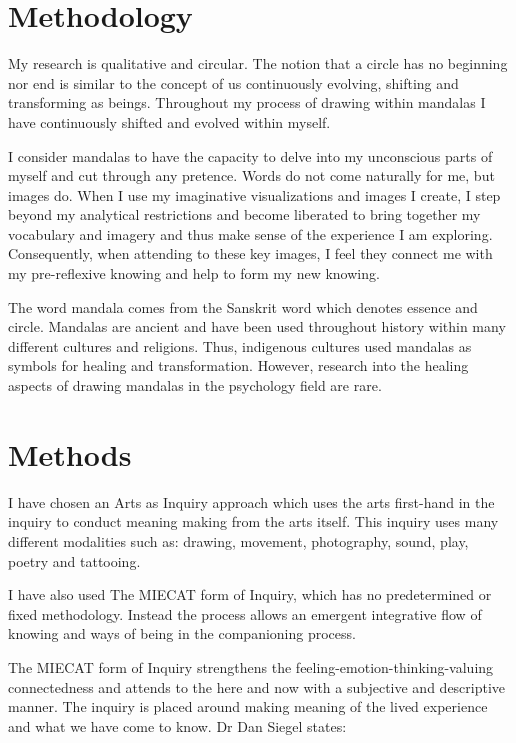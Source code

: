\section{Methodology}

My research is qualitative and circular. The notion that a circle has no beginning nor end is similar to the concept of us continuously evolving, shifting and transforming as beings. Throughout my process of drawing within mandalas I have continuously shifted and evolved within myself. 

I consider mandalas to have the capacity to delve into my unconscious parts of myself and cut through any pretence. Words do not come naturally for me, but images do. When I use my imaginative visualizations and images I create, I step beyond my analytical restrictions and become liberated to bring together my vocabulary and imagery and thus make sense of the experience I am exploring. Consequently, when attending to these key images, I feel they connect me with my pre-reflexive knowing and help to form my new knowing. 

The word mandala comes from the Sanskrit word which denotes essence and circle. Mandalas are ancient and have been used throughout history within many different cultures and religions. Thus, indigenous cultures used mandalas as symbols for healing and transformation. However, research into the healing aspects of drawing mandalas in the psychology field are rare. 

\section{Methods}


I have chosen an Arts as Inquiry approach which uses the arts first-hand in the inquiry to conduct meaning making from the arts itself. This inquiry uses many different modalities such as: drawing, movement, photography, sound, play, poetry and tattooing.

I have also used The MIECAT form of Inquiry, which has no predetermined or fixed methodology. Instead the process allows an emergent integrative flow of knowing and ways of being in the companioning process.  

The MIECAT form of Inquiry strengthens the feeling-emotion-thinking-valuing connectedness and attends to the here and now with a subjective and descriptive manner. The inquiry is placed around making meaning of the lived experience and what we have come to know. Dr Dan Siegel states: 

